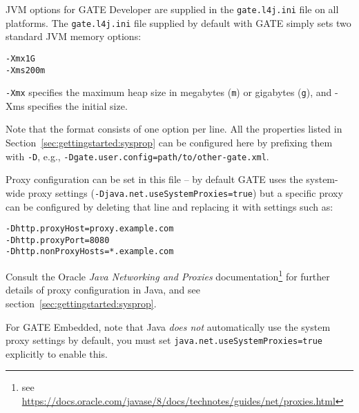 JVM options for GATE Developer are supplied in the \texttt{gate.l4j.ini} file
on all platforms.  The \texttt{gate.l4j.ini} file supplied by default with GATE
simply sets two standard JVM memory options:
%
\begin{verbatim}
-Xmx1G
-Xms200m
\end{verbatim}
%
\texttt{-Xmx} specifies the maximum heap size in megabytes (\texttt{m}) or
gigabytes (\texttt{g}), and -Xms specifies the initial size. 

Note that the format consists of one option per line.  All the properties listed
in Section~\ref{sec:gettingstarted:sysprop} can be configured here by prefixing
them with \texttt{-D}, e.g., \texttt{-Dgate.user.config=path/to/other-gate.xml}.

Proxy configuration can be set in this file -- by default GATE uses the
system-wide proxy settings (\verb!-Djava.net.useSystemProxies=true!) but a
specific proxy can be configured by deleting that line and replacing it with
settings such as:
%
\begin{verbatim}
-Dhttp.proxyHost=proxy.example.com  
-Dhttp.proxyPort=8080  
-Dhttp.nonProxyHosts=*.example.com 
\end{verbatim}

Consult the Oracle \emph{Java Networking and Proxies} documentation\footnote{see
  \url{https://docs.oracle.com/javase/8/docs/technotes/guides/net/proxies.html}}
for further details of proxy configuration in Java, and see 
section~\ref{sec:gettingstarted:sysprop}.

For GATE Embedded, note that Java \emph{does not} automatically use the system
proxy settings by default, you must set \verb!java.net.useSystemProxies=true!
explicitly to enable this.
%

